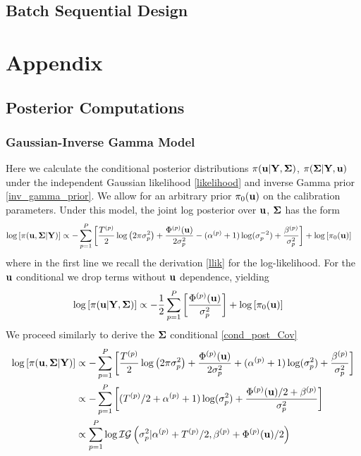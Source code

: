 \documentclass[12pt]{article}
\begin{document}
\subsection{Batch Sequential Design}


\section{Appendix}

\subsection{Posterior Computations}

\subsubsection{Gaussian-Inverse Gamma Model}
Here we calculate the conditional posterior distributions $\pi(\mathbf{u}|\mathbf{Y}, \boldsymbol{\Sigma})$, $\pi(\boldsymbol{\Sigma}|\mathbf{Y}, \mathbf{u})$ under the independent Gaussian 
likelihood \ref{likelihood} and inverse Gamma prior \ref{inv_gamma_prior}. We allow for an arbitrary prior $\pi_0(\mathbf{u})$ on the calibration parameters.
Under this model, the joint log posterior over $\mathbf{u}$, $\boldsymbol{\Sigma}$ has the form 
\begin{align*}
\log\left[\pi(\mathbf{u}, \boldsymbol{\Sigma}|\mathbf{Y})\right] &\propto -\sum_{p = 1}^{P} \left[\frac{{T}^{(p)}}{2} \log\left(2\pi \sigma_{p}^2 \right) + \frac{{\Phi}^{(p)}(\mathbf{u})}{2\sigma_{p}^2}  - ({\alpha}^{(p)} + 1)\log(\sigma_{p}^{-2}) + \frac{{\beta}^{(p)}}{\sigma_{p}^2} \right] + \log\left[\pi_0(\mathbf{u})\right] 
\end{align*}
where in the first line we recall the derivation \ref{llik} for the log-likelihood. For the $\mathbf{u}$ conditional we drop terms without $\mathbf{u}$ dependence, yielding
\begin{align*}
\log\left[\pi(\mathbf{u}|\mathbf{Y}, \boldsymbol{\Sigma})\right] &\propto -\frac{1}{2} \sum_{p = 1}^{P} \left[\frac{{\Phi}^{(p)}(\mathbf{u})}{\sigma_{p}^2}\right]  + \log\left[\pi_0(\mathbf{u})\right] 
\end{align*}
We proceed similarly to derive the $\boldsymbol{\Sigma}$ conditional \ref{cond_post_Cov}
\begin{align*}
\log\left[\pi(\mathbf{u}, \boldsymbol{\Sigma}|\mathbf{Y})\right] &\propto - \sum_{p = 1}^{P} \left[\frac{{T}^{(p)}}{2} \log\left(2\pi \sigma_{p}^2 \right) + \frac{{\Phi}^{(p)}(\mathbf{u})}{2\sigma_{p}^2}  + ({\alpha}^{(p)} + 1)\log(\sigma_{p}^{2}) + \frac{{\beta}^{(p)}}{\sigma_{p}^2} \right] \\
&\propto - \sum_{p = 1}^{P} \left[({T}^{(p)}/2 + {\alpha}^{(p)} + 1)\log(\sigma_{p}^2) + \frac{{\Phi}^{(p)}(\mathbf{u})/2 + {\beta}^{(p)}}{\sigma_{p}^2} \right] \\
&\propto \sum_{p = 1}^{P} \log \mathcal{IG}\left(\sigma_{p}^2|{\alpha}^{(p)} + {T}^{(p)}/2, {\beta}^{(p)} + {\Phi}^{(p)}(\mathbf{u})/2 \right)
\end{align*}
\end{document}
